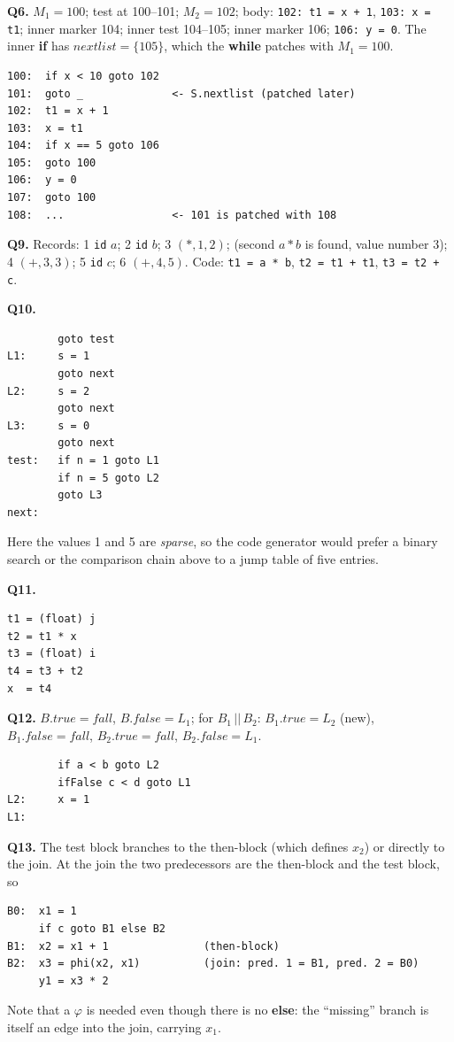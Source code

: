 \documentclass[11pt,a4paper]{article}
\begin{document}
\textbf{Q6.} $M_1=100$; test at 100--101; $M_2=102$; body: \texttt{102: t1 = x + 1}, \texttt{103: x = t1}; inner marker 104; inner test 104--105; inner marker 106; \texttt{106: y = 0}. The inner \textbf{if} has $\mathit{nextlist}=\{105\}$, which the \textbf{while} patches with $M_1=100$.
\begin{lstlisting}
100:  if x < 10 goto 102
101:  goto _              <- S.nextlist (patched later)
102:  t1 = x + 1
103:  x = t1
104:  if x == 5 goto 106
105:  goto 100
106:  y = 0
107:  goto 100
108:  ...                 <- 101 is patched with 108
\end{lstlisting}

\textbf{Q9.} Records: 1 \texttt{id} $a$; 2 \texttt{id} $b$; 3 $(*,1,2)$; (second $a*b$ is found, value number 3); 4 $(+,3,3)$; 5 \texttt{id} $c$; 6 $(+,4,5)$. Code: \texttt{t1 = a * b}, \texttt{t2 = t1 + t1}, \texttt{t3 = t2 + c}.

\textbf{Q10.}
\begin{lstlisting}
        goto test
L1:     s = 1
        goto next
L2:     s = 2
        goto next
L3:     s = 0
        goto next
test:   if n = 1 goto L1
        if n = 5 goto L2
        goto L3
next:
\end{lstlisting}
Here the values 1 and 5 are \emph{sparse}, so the code generator would prefer a binary search or the comparison chain above to a jump table of five entries.

\textbf{Q11.}
\begin{lstlisting}
t1 = (float) j
t2 = t1 * x
t3 = (float) i
t4 = t3 + t2
x  = t4
\end{lstlisting}

\textbf{Q12.} $B.true=\textit{fall}$, $B.false=L_1$; for $B_1\,||\,B_2$: $B_1.true=L_2$ (new), $B_1.false=\textit{fall}$, $B_2.true=\textit{fall}$, $B_2.false=L_1$.
\begin{lstlisting}
        if a < b goto L2
        ifFalse c < d goto L1
L2:     x = 1
L1:
\end{lstlisting}

\textbf{Q13.} The test block branches to the then-block (which defines $x_2$) or directly to the join. At the join the two predecessors are the then-block and the test block, so
\begin{lstlisting}
B0:  x1 = 1
     if c goto B1 else B2
B1:  x2 = x1 + 1               (then-block)
B2:  x3 = phi(x2, x1)          (join: pred. 1 = B1, pred. 2 = B0)
     y1 = x3 * 2
\end{lstlisting}
Note that a $\varphi$ is needed even though there is no \textbf{else}: the ``missing'' branch is itself an edge into the join, carrying $x_1$.
\end{document}

